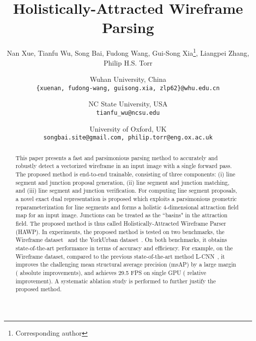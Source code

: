 \documentclass[10pt,twocolumn,letterpaper]{article}
\begin{document}
\setlength{\textfloatsep}{8pt}


\setlength{\belowdisplayskip}{1pt} \setlength{\belowdisplayshortskip}{0pt}
\setlength{\abovedisplayskip}{1pt} \setlength{\abovedisplayshortskip}{0pt} 

\title{Holistically-Attracted Wireframe Parsing}
\author{{Nan Xue}, 
{Tianfu Wu,
	 {Song Bai},
	 {Fudong Wang},
	 {Gui-Song Xia\thanks{Corresponding author}},
	 {Liangpei Zhang}, Philip H.S. Torr}
	 \vspace{1mm}\\
	 \and
	 {Wuhan University, China}
	 \\
	 {\small \tt \{xuenan, fudong-wang, guisong.xia, zlp62\}@whu.edu.cn}
    \and
    {NC State University, USA}
    \\
    {\small \tt tianfu\_wu@ncsu.edu}
	 \and
	 {University of Oxford, UK}\\
  	 {\small \tt songbai.site@gmail.com, philip.torr@eng.ox.ac.uk}
}

\maketitle


\begin{abstract}
This paper presents a fast and parsimonious parsing method to accurately and robustly detect a vectorized wireframe in an input image with a single  forward pass. The proposed method is end-to-end trainable, consisting of three components: (i) line segment and junction proposal generation, (ii) line segment and junction matching, and (iii) line segment and junction verification. 
For computing line segment proposals, a novel exact dual representation is proposed which exploits a parsimonious  geometric reparameterization for line segments and forms a holistic 4-dimensional attraction field map for an input image. Junctions can be treated as the ``basins" in the attraction field. The proposed method is thus called Holistically-Attracted Wireframe Parser (HAWP). In experiments, the proposed method is tested on two benchmarks, the Wireframe dataset~\cite{Huang2018a} and the YorkUrban dataset~\cite{Denis2008}. On both benchmarks, it obtains state-of-the-art performance in terms of accuracy and efficiency. For example, on the Wireframe dataset, compared to the previous state-of-the-art method L-CNN~\cite{ZhouQM19}, it improves the challenging mean structural average precision (msAP) by a large margin ( absolute improvements), and achieves 29.5 FPS on single GPU ( relative improvement). 
A systematic ablation study is performed to further justify the proposed method.         
\end{abstract}
\end{document}
